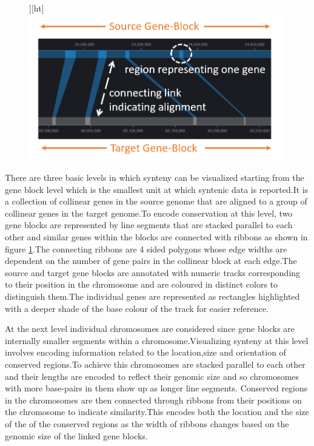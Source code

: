 \begin{figure}][ht]
  \centering
  \includegraphics[width=.50\linewidth]{images/ch_4_link_plot.PNG}
  \label{fig:ch_4_link_plot}
\end{figure}


There are three basic levels in which synteny can be visualized starting from the gene block level which is the smallest unit at which syntenic data is reported.It is a collection of collinear genes in the source genome that are aligned to a group of collinear genes in the target genome.To encode conservation at this level, two gene blocks are represented by line segments that are stacked parallel to each other and similar genes within the blocks are connected with ribbons as shown in figure \ref{fig:ch_4_link_plot}.The connecting ribbons are 4 sided polygons whose edge widths are dependent on the number of gene pairs in the collinear block at each edge.The source and target gene blocks are annotated with numeric tracks corresponding to their position in the chromosome and are coloured in distinct colors to distinguish them.The individual genes are represented as rectangles highlighted with a deeper shade of the base colour of the track for easier reference. 

At the next level individual chromosomes are considered since gene blocks are internally smaller segments within a chromosome.Visualizing synteny at this level involves encoding information related to the location,size and orientation of conserved regions.To achieve this chromosomes are stacked parallel to each other and their lengths are encoded to reflect their genomic size and so chromosomes with more base-pairs in them show up as longer line segments. Conserved regions in the chromosomes are then connected through ribbons from their positions on the chromosome to indicate similarity.This encodes both the location and the size of the of the conserved regions as the width of ribbons changes based on the genomic size of the linked gene blocks.


